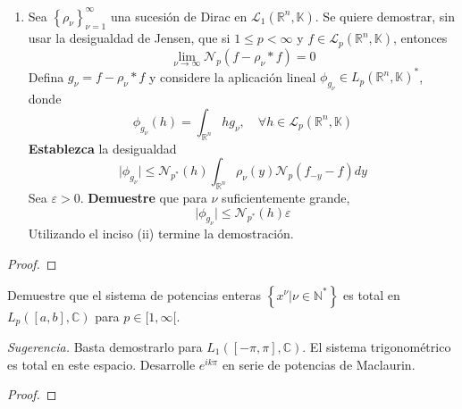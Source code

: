 \documentclass[12pt]{report}
\theoremstyle{largebreak}
\newcommand\abs[1]{\ensuremath{\big|#1\big|}}
\newcommand{\N}[2]{\ensuremath{\mathcal{N}_{#1}\left(#2\right)}}
\begin{document}
\begin{excer}
\begin{enumerate}
            \item Sea $\left\{\rho_\nu \right\}_{\nu=1}^\infty$ una sucesión de Dirac en $\mathcal{L}_1(\mathbb{R}^n,\mathbb{K})$. Se quiere demostrar, sin usar la desigualdad de Jensen, que si $1\leq p<\infty$ y $f\in\mathcal{L}_p(\mathbb{R}^n,\mathbb{K})$, entonces
            \begin{equation*}
                \lim_{\nu\rightarrow\infty}\N{p}{f-\rho_\nu*f}=0
            \end{equation*}
            Defina $g_\nu=f-\rho_\nu*f$ y considere la aplicación lineal $\phi_{g_\nu}\in L_{p}(\mathbb{R}^n,\mathbb{K})^*$, donde
            \begin{equation*}
                \phi_{g_\nu}(h)=\int_{\mathbb{R}^n}hg_\nu,\quad\forall h\in \mathcal{L}_p(\mathbb{R}^n,\mathbb{K})
            \end{equation*}
            \textbf{Establezca} la desigualdad
            \begin{equation*}
                \abs{\phi_{g_\nu}}\leq\N{p^*}{h}\int_{\mathbb{R}^n}\rho_\nu(y)\N{p}{f_{-y}-f}dy
            \end{equation*}
            Sea $\varepsilon>0$. \textbf{Demuestre} que para $\nu$ suficientemente grande,
            \begin{equation*}
                \abs{\phi_{g_\nu}}\leq\N{p^*}{h}\varepsilon
            \end{equation*}
            Utilizando el inciso (ii) termine la demostración.
        \end{enumerate}
    \end{excer}

    \begin{proof}
        
    \end{proof}

    \begin{excer}
        Demuestre que el sistema de potencias enteras $\left\{x^\nu\Big|\nu\in\mathbb{N}^* \right\}$ es total en $L_p([a,b],\mathbb{C})$ para $p\in[1,\infty[$.

        \textit{Sugerencia.} Basta demostrarlo para $L_1([-\pi,\pi],\mathbb{C})$. El sistema trigonométrico es total en este espacio. Desarrolle $e^{ik\pi}$ en serie de potencias de Maclaurin.
    \end{excer}

    \begin{proof}
        
    \end{proof}
\end{document}
